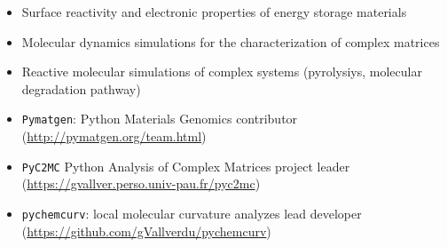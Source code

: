 \documentclass[10pt,a4paper,ragged2e,academicons]{../cvDev/altacv}
\begin{document}
\divider

\vspace{-1mm}
\begin{itemize}
\item Surface reactivity and electronic properties of energy storage materials
\item Molecular dynamics simulations for the characterization of complex matrices
\item Reactive molecular simulations of complex systems (pyrolysiys, molecular degradation pathway)
\end{itemize}

\divider

\vspace{-1mm}
\begin{itemize}
\item \texttt{Pymatgen}: Python Materials Genomics \hfill {\color{LightGrey}\small contributor}\\
{(\footnotesize\url{http://pymatgen.org/team.html})}
\item \texttt{PyC2MC} Python Analysis of Complex Matrices \hfill {\color{LightGrey}\small project leader}\\
{(\footnotesize\url{https://gvallver.perso.univ-pau.fr/pyc2mc})}
\item \texttt{pychemcurv}: local molecular curvature analyzes \hfill {\color{LightGrey}\small lead developer}
\hbox{(\footnotesize\url{https://github.com/gVallverdu/pychemcurv})}
\end{itemize}






\end{document}
